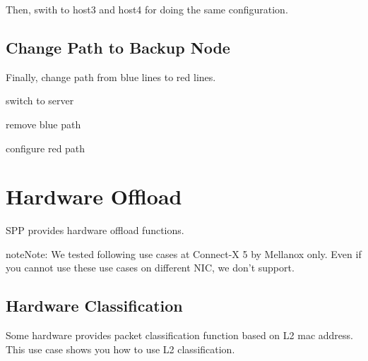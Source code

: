 \documentclass[a4paper,11pt,openany,oneside,english]{sphinxmanual}
\begin{document}
Then, swith to host3 and host4 for doing the same configuration.


\subsection{Change Path to Backup Node}
\label{\detokenize{usecases/multi_nodes:change-path-to-backup-node}}
Finally, change path from blue lines to red lines.

\begin{sphinxVerbatim}[commandchars=\\\{\},formatcom=\footnotesize]
 switch to server 

 remove blue path

 configure red path
\end{sphinxVerbatim}


\section{Hardware Offload}
\label{\detokenize{usecases/hardware-offload:hardware-offload}}\label{\detokenize{usecases/hardware-offload:usecase-hardware-offload}}\label{\detokenize{usecases/hardware-offload::doc}}
SPP provides hardware offload functions.

\begin{sphinxadmonition}{note}{Note:}
We tested following use cases at Connect-X 5 by Mellanox only.
Even if you cannot use these use cases on different NIC, we don’t support.
\end{sphinxadmonition}


\subsection{Hardware Classification}
\label{\detokenize{usecases/hardware-offload:hardware-classification}}
Some hardware provides packet classification function based on
L2 mac address. This use case shows you how to use L2 classification.
\end{document}
